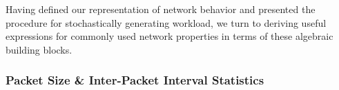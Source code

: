 \documentclass[twocolumn,final]{svjour3}
\begin{document}
Having defined our representation of network behavior and presented the procedure for stochastically generating workload, we turn to deriving useful expressions for commonly used network properties in terms of these algebraic building blocks.

\subsubsection{Packet Size \& Inter-Packet Interval Statistics}
\label{sec:flow-totals}

\end{document}
